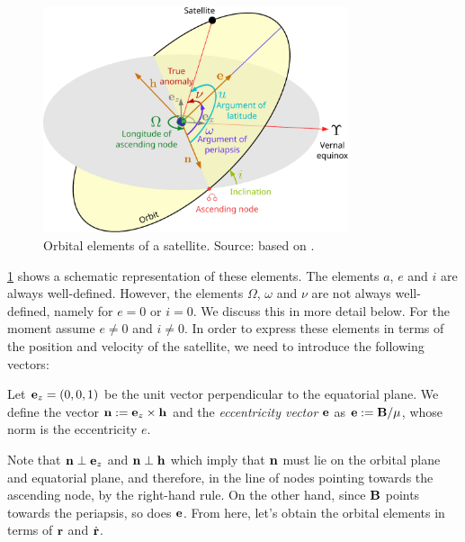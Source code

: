 \documentclass[../main.tex]{subfiles}
\begin{document}
\begin{figure}[ht]
  \centering
  \includegraphics[width=0.8\textwidth]{Images/orbital_elements.pdf}
  \caption{Orbital elements of a satellite. Source: based on \cite{wiki:orbital-elements}.}
  \label{fig:orbital_elements}
\end{figure}
\cref{fig:orbital_elements} shows a schematic representation of these elements. The elements $a$, $e$ and $i$ are always well-defined. However, the elements $\Omega$, $\omega$ and $\nu$ are not always well-defined, namely for $e=0$ or $i=0$. We discuss this in more detail below. For the moment assume $e\neq 0$ and $i\neq 0$. In order to express these elements in terms of the position and velocity of the satellite, we need to introduce the following vectors:
\begin{definition}
  Let $\boldsymbol{\mathrm{e}}_z=(0,0,1)$ be the unit vector perpendicular to the equatorial plane. We define the vector $\boldsymbol{\mathrm{n}}:=\boldsymbol{\mathrm{e}}_z\times \boldsymbol{\mathrm{h}}$ and the \emph{eccentricity vector} $\boldsymbol{\mathrm{e}}$ as $\boldsymbol{\mathrm{e}}:=\boldsymbol{\mathrm{B}}/\mu$, whose norm is the eccentricity $e$.
\end{definition}
Note that $\boldsymbol{\mathrm{n}}\perp \boldsymbol{\mathrm{e}}_z$ and $\boldsymbol{\mathrm{n}}\perp \boldsymbol{\mathrm{h}}$ which imply that $\boldsymbol{\mathrm{n}}$ must lie on the orbital plane and equatorial plane, and therefore, in the line of nodes pointing towards the ascending node, by the right-hand rule. On the other hand, since $\boldsymbol{\mathrm{B}}$ points towards the periapsis, so does $\boldsymbol{\mathrm{e}}$. From here, let's obtain the orbital elements in terms of $\boldsymbol{\mathrm{r}}$ and $\dot{\boldsymbol{\mathrm{r}}}$.
\end{document}
